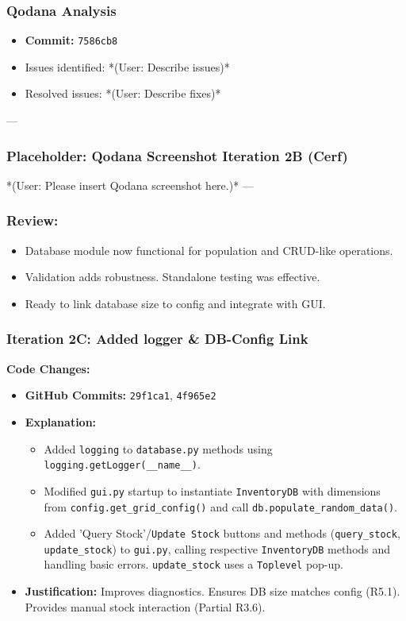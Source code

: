 \subsubsection{Qodana Analysis}
\begin{itemize}
	\item \textbf{Commit:} \verb|7586cb8|
	\item Issues identified: *(User: Describe issues)*
	\item Resolved issues: *(User: Describe fixes)*
\end{itemize}

--- %
\subsubsection*{Placeholder: Qodana Screenshot Iteration 2B (Cerf)}
*(User: Please insert Qodana screenshot here.)*
---

\subsubsection{Review:}
\begin{itemize}
	\item Database module now functional for population and CRUD-like operations.
	\item Validation adds robustness. Standalone testing was effective.
	\item Ready to link database size to config and integrate with GUI.
\end{itemize}

\newpage

\subsubsection{Iteration 2C: Added logger \& DB-Config Link}

\textbf{Code Changes:}
\begin{itemize}
	\item \textbf{GitHub Commits:} \verb|29f1ca1|, \verb|4f965e2|
	\item \textbf{Explanation:}
	\begin{itemize}
		\item Added \verb|logging| to \verb|database.py| methods using \verb|logging.getLogger(__name__)|.
		\item Modified \verb|gui.py| startup to instantiate \verb|InventoryDB| with dimensions from \verb|config.get_grid_config()| and call \verb|db.populate_random_data()|.
		\item Added 'Query Stock'/\verb|Update Stock| buttons and methods (\verb|query_stock|, \verb|update_stock|) to \verb|gui.py|, calling respective \verb|InventoryDB| methods and handling basic errors. \verb|update_stock| uses a \verb|Toplevel| pop-up.
	\end{itemize}
	\item \textbf{Justification:} Improves diagnostics. Ensures DB size matches config (R5.1). Provides manual stock interaction (Partial R3.6).
\end{itemize}

